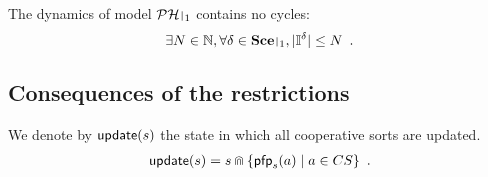 \begin{criterion}
\label{cr:bounded}
  The dynamics of model $\restriction{\PH}{1}$ contains no cycles:
  $$\exists N \in \sN, \forall \delta \in \restriction{\Sce}{1}, |\indexes{\delta}| \leq N \enspace.$$
\end{criterion}



\subsection{Consequences of the restrictions}
We denote by $\mathsf{update}(s)$ the state in which all cooperative sorts are updated.
\begin{align*}
  \mathsf{update}(s) = s \Cap \{ \mathsf{pfp}_{s}(a) \mid a \in CS \} \enspace.
\end{align*}

